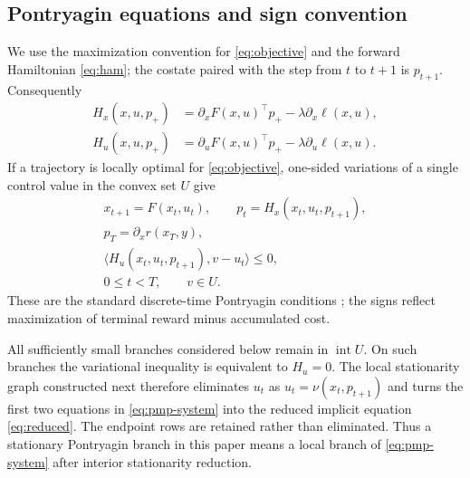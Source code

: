 \documentclass[twocolumn,nameyear,amsthm]{autart}
\newcommand{\Fbar}{F}
\numberwithin{equation}{section}
\begin{document}
\subsection{Pontryagin equations and sign convention}\label{sec:pmp}
We use the maximization convention for \eqref{eq:objective} and the forward
Hamiltonian \eqref{eq:ham}; the costate paired with the step from $t$ to
$t+1$ is $p_{t+1}$.  Consequently
\[
\begin{aligned}
   H_x(x,u,p_+)&=\partial_x\Fbar(x,u)^\top p_+-\lambda\partial_x\ell(x,u),\\
   H_u(x,u,p_+)&=\partial_u\Fbar(x,u)^\top p_+-\lambda\partial_u\ell(x,u).
\end{aligned}
\]
If a trajectory is locally optimal for \eqref{eq:objective}, one-sided
variations of a single control value in the convex set $U$ give
\begin{equation}\label{eq:pmp-system}
\begin{gathered}
    x_{t+1}=\Fbar(x_t,u_t),\qquad
    p_t=H_x(x_t,u_t,p_{t+1}),\\
    p_T=\partial_x r(x_T,y),\\
    \langle H_u(x_t,u_t,p_{t+1}),v-u_t\rangle\le0,\\
    0\le t<T,\qquad v\in U.
\end{gathered}
\end{equation}
These are the standard discrete-time Pontryagin conditions
\citep{halkin1966maximum,bertsekas2017dynamic}; the signs reflect maximization
of terminal reward minus accumulated cost.

All sufficiently small branches considered below remain in
$\operatorname{int}U$.  On such branches the variational inequality is
equivalent to $H_u=0$.  The local stationarity graph constructed next therefore
eliminates $u_t$ as $u_t=\nu(x_t,p_{t+1})$ and turns the first two equations in
\eqref{eq:pmp-system} into the reduced implicit equation \eqref{eq:reduced}.
The endpoint rows are retained rather than eliminated.  Thus a stationary
Pontryagin branch in this paper means a local branch of \eqref{eq:pmp-system}
after interior stationarity reduction.
\end{document}
